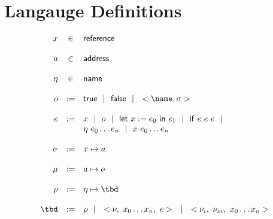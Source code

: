 \documentclass[9pt]{article}
\begin{document}
\section{Langauge Definitions}

\[
	\begin{array}{rcl}
	\reft &\in& \mathsf{reference}\\
	\\
	\addrt &\in& \mathsf{address}\\
	\\
	\namet &\in& \mathsf{name}\\
	\\
	\objt &:=& \truev \alt \falsev \alt \obje\\
	\\
	\exprt &:=& \reft \alt \objt \alt \letbinde{\reft}{\exprt_0}{\exprt_1} \alt \ife{\exprt}{\exprt}{\exprt} \alt\\
	       && \calle{\namet}{n} \alt \calle{\reft}{n}\\
	\\
	\refenv &:=& \reft \mapsto \addrt\\
	\\
	\heapenv &:=& \addrt \mapsto \objt\\
	\\
	\namespace &:=& \namet \mapsto \tbd\\
	\\
	\tbd &:=& \namespace \alt \function{n}{\exprt} \alt \class{n}\\
	\\
	\end{array}
\]
\end{document}
